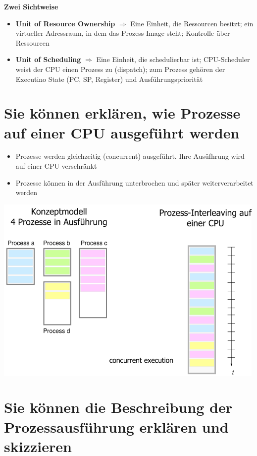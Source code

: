 \documentclass{report}
\newenvironment{Figure}
	{\par\medskip\noindent\minipage{\linewidth}}
	{\endminipage\par\medskip}
\theoremstyle{definition}
\theoremstyle{example}
\begin{document}
\textbf{Zwei Sichtweise}\\
\begin{itemize}
	\item \textbf{Unit of Resource Ownership} $\Rightarrow$ Eine Einheit, die Ressourcen besitzt; ein virtueller Adressraum, in dem das Prozess Image steht; Kontrolle über Ressourcen
	\item \textbf{Unit of Scheduling} $\Rightarrow$ Eine Einheit, die schedulierbar ist; CPU-Scheduler weist der CPU einen Prozess zu (dispatch); zum Prozess gehören der Executino State (PC, SP, Register) und Ausführungspriorität
\end{itemize}
\section{Sie können erklären, wie Prozesse auf einer CPU ausgeführt werden}
\begin{itemize}
	\item Prozesse werden gleichzeitig (concurrent) ausgeführt. Ihre Ausüfhrung wird auf einer CPU verschränkt
	\item Prozesse können in der Ausführung unterbrochen und später weiterverarbeitet werden
\end{itemize}

\begin{Figure}
\centering
\includegraphics[width=500px]{img/Prozessausfuehrung.png}
	\label{fig:Prozessausführung einer CPU}
\end{Figure}

\section{Sie können die Beschreibung der Prozessausführung erklären und skizzieren}
\end{document}
